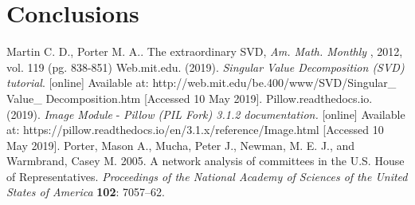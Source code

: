 \documentclass[letterpaper,12pt]{article}
\begin{document}
\section{Conclusions}
\newpage
\begin{thebibliography}{9}
Martin C. D.,  Porter M. A.. The extraordinary SVD, \textit{Am. Math. Monthly} , 2012, vol. 119 (pg. 838-851)
Web.mit.edu. (2019). \textit{Singular Value Decomposition (SVD) tutorial}. [online] Available at: http://web.mit.edu/be.400/www/SVD/Singular\_ Value\_ Decomposition.htm [Accessed 10 May 2019].
Pillow.readthedocs.io. (2019). \textit{Image Module} - \textit{Pillow (PIL Fork) 3.1.2 documentation.} [online] Available at: https://pillow.readthedocs.io/en/3.1.x/reference/Image.html [Accessed 10 May 2019].
Porter, Mason A., Mucha, Peter J., Newman, M. E. J., and Warmbrand, Casey M. 2005. A network analysis of committees in the U.S. House of Representatives. \textit{Proceedings of the National Academy of Sciences of the United States of America} \textbf{102}: 7057–62.
\end{thebibliography}
\end{document}
